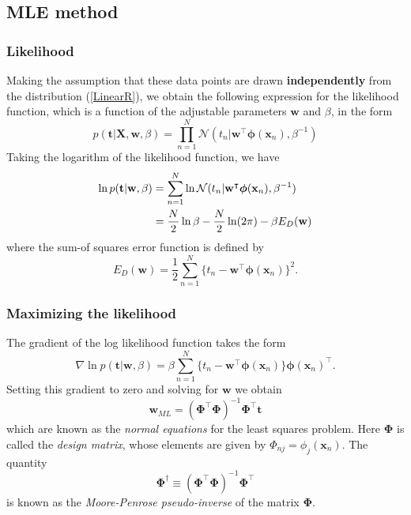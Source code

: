 \documentclass[a4paper]{book}
\renewcommand{\bf}{\mathbf}
\renewcommand{\cal}{\mathcal}
\newcommand{\imp}[1]{\textit{#1}}
\newcommand{\bs}{\boldsymbol}
\begin{document}
\subsection{MLE method}
\subsubsection{Likelihood}
Making the assumption that these data points are drawn \textbf{independently} from the distribution (\ref{LinearR}), we obtain the following expression for the likelihood function, which is a function of the adjustable parameters $\bf{w}$ and $\beta$, in the form
\begin{equation}
p(\bf{t}|\bf{X,w},\beta) = \prod_{n=1}^N \cal{N}(t_n|\bf{w}^{\intercal} \bs{\phi}(\bf{x}_n),\beta^{-1})
\end{equation}
Taking the logarithm of the likelihood function, we have
\begin{align}
	\ln p(\bf{t}|\bf{w},\beta) &= \sum_{n=1}^N \ln \cal{N}(t_n|\bf{w}^{\intercal} \bs{\phi}(\bf{x}_n),\beta^{-1}) \notag \\
	&= \frac{N}{2} \ln \beta - \frac{N}{2} \ln(2\pi) - \beta E_D(\bf{w})
\end{align}
where the sum-of squares error function is defined by
\begin{equation}
	E_D(\bf{w}) = \frac{1}{2} \sum_{n=1}^N \{ t_n - \bf{w}^{\intercal} \bs{\phi}(\bf{x}_n) \}^2.
\end{equation}
\subsubsection{Maximizing the likelihood}
The gradient of the log likelihood function takes the form
\begin{equation}
	\nabla \ln p(\bf{t}|\bf{w},\beta) = \beta \sum_{n=1}^N \{ t_n-\bf{w}^{\intercal} \bs{\phi}(\bf{x}_n) \} \bs{\phi}(\bf{x}_n)^{\intercal}.
\end{equation}
Setting this gradient to zero and solving for $\bf{w}$ we obtain
\begin{equation}
	\bf{w}_{ML} = (\bs{\Phi}^{\intercal} \bs{\Phi})^{-1} \bs{\Phi}^{\intercal} \bf{t}
\end{equation}
which are known as the \imp{normal equations} for the least squares problem. Here $\bs{\Phi}$ is called the \imp{design matrix}, whose elements are given by $\Phi_{nj} = \phi_j (\bf{x}_n)$. The quantity
\begin{equation}
	\bs{\Phi}^{\dagger} \equiv (\bs{\Phi}^{\intercal} \bs{\Phi})^{-1} \bs{\Phi}^{\intercal}
\end{equation}
is known as the \imp{Moore-Penrose pseudo-inverse} of the matrix $\bs{\Phi}$.
\end{document}
